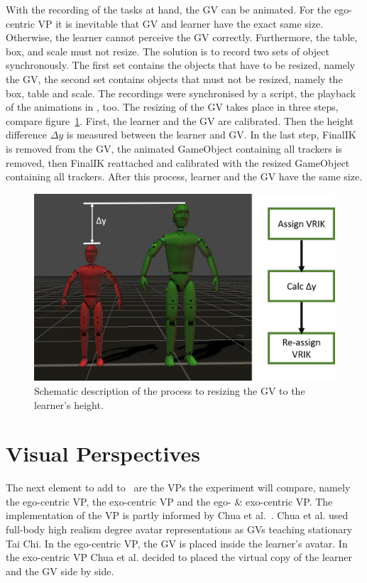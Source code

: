 With the recording of the tasks at hand, the GV can be animated. For the ego-centric VP it is inevitable that GV and learner have the exact same size. Otherwise, the learner cannot perceive the GV correctly. Furthermore, the table, box, and scale must not resize. The solution is to record two sets of object synchronously. The first set contains the objects that have to be resized, namely the GV, the second set contains objects that must not be resized, namely the box, table and scale. The recordings were synchronised by a script, the playback of the animations in \exgo, too. The resizing of the GV takes place in three steps, compare figure~\ref{fig:resize}. First, the learner and the GV are calibrated. Then the height difference $\Delta y$ is measured between the learner and GV. In the last step, FinalIK is removed from the GV, the animated GameObject containing all trackers is removed, then FinalIK reattached and calibrated with the resized GameObject containing all trackers. After this process, learner and the GV have the same size.
\begin{figure}[htb]
	\centering
	\includegraphics[width=\textwidth]{figures/resize.png}
	\caption[Resizing the GV to the learner's height.]{Schematic description of the process to resizing the GV to the learner's height.}
	\label{fig:resize}
\end{figure}

\section{Visual Perspectives}
\label{sec:perspectives}
The next element to add to \exgo\ are the VPs the experiment will compare, namely the ego-centric VP, the exo-centric VP and the ego- \& exo-centric VP. The implementation of the VP is partly informed by Chua et al.~\cite{thaichichua}. Chua et al. used full-body high realism degree avatar representations as GVs teaching stationary Tai Chi. In the ego-centric VP, the GV is placed inside the learner's avatar. In the exo-centric VP Chua et al. decided to placed the virtual copy of the learner and the GV side by side.\\

